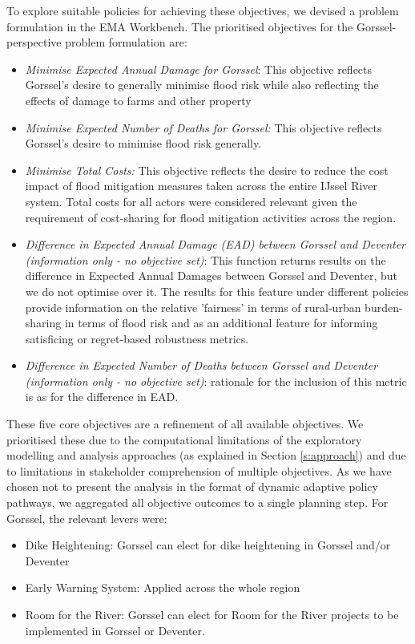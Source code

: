 To explore suitable policies for achieving these objectives, we devised a problem formulation in the EMA Workbench.
The prioritised objectives for the Gorssel-perspective problem formulation are:
\begin{itemize}
    \item \textit{Minimise Expected Annual Damage for Gorssel}: This objective reflects Gorssel's desire to generally minimise flood risk while also reflecting the effects of damage to farms and other property
    \item \textit{Minimise Expected Number of Deaths for Gorssel:} This objective reflects Gorssel's desire to minimise flood risk generally.
    \item \textit{Minimise Total Costs:} This objective reflects the desire to reduce the cost impact of flood mitigation measures taken across the entire IJssel River system. Total costs for all actors were considered relevant given the requirement of cost-sharing for flood mitigation activities across the region.
    \item \textit{Difference in Expected Annual Damage (EAD) between Gorssel and Deventer (information only - no objective set)}: This function returns results on the difference in Expected Annual Damages between Gorssel and Deventer, but we do not optimise over it. The results for this feature under different policies provide information on the relative 'fairness' in terms of rural-urban burden-sharing in terms of flood risk and as an additional feature for informing satisficing or regret-based robustness metrics.
    \item \textit{Difference in Expected Number of Deaths between Gorssel and Deventer (information only - no objective set)}: rationale for the inclusion of this metric is as for the difference in EAD.
\end{itemize}
These five core objectives are a refinement of all available objectives. We prioritised these due to the computational limitations of the exploratory modelling and analysis approaches (as explained in Section \ref{s:approach}) and due to limitations in stakeholder comprehension of multiple objectives. As we have chosen not to present the analysis in the format of dynamic adaptive policy pathways, we aggregated all objective outcomes to a single planning step. 
For Gorssel, the relevant levers were:
\begin{itemize}
    \item Dike Heightening: Gorssel can elect for dike heightening in Gorssel and/or Deventer
    \item Early Warning System: Applied across the whole region
    \item Room for the River: Gorssel can elect for Room for the River projects to be implemented in Gorssel or Deventer.
\end{itemize}


